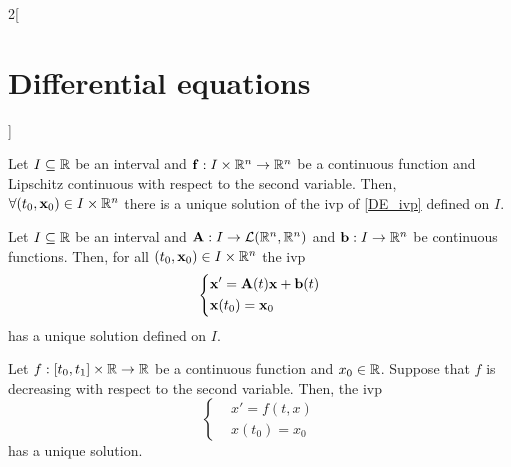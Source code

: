 \documentclass[../../../main.tex]{subfiles}
\begin{document}
\begin{multicols}{2}[\section{Differential equations}]
\begin{corollary}
    \end{corollary}
    \begin{prop}
        Let $I\subseteq\mathbb{R}$ be an interval and $\boldsymbol{\mathrm{f}}:I\times\mathbb{R}^n\rightarrow\mathbb{R}^n$ be a continuous function and Lipschitz continuous with respect to the second variable. Then, $\forall(t_0,\boldsymbol{\mathrm{x}}_0)\in I\times\mathbb{R}^n$ there is a unique solution of the ivp of \cref{DE_ivp} defined on $I$.
    \end{prop}
    \begin{corollary}
        Let $I\subseteq\mathbb{R}$ be an interval and $\boldsymbol{\mathrm{A}}:I\rightarrow\mathcal{L}(\mathbb{R}^n,\mathbb{R}^n)$ and $\boldsymbol{\mathrm{b}}:I\rightarrow\mathbb{R}^n$ be continuous functions. Then, for all $(t_0,\boldsymbol{\mathrm{x}}_0)\in I\times\mathbb{R}^n$ the ivp
        $$
            \left\{
            \begin{aligned}
                 & \boldsymbol{\mathrm{x}}'=\boldsymbol{\mathrm{A}}(t)\boldsymbol{\mathrm{x}}+\boldsymbol{\mathrm{b}}(t) \\
                 & \boldsymbol{\mathrm{x}}(t_0)=\boldsymbol{\mathrm{x}}_0
            \end{aligned}
            \right.
        $$
        has a unique solution defined on $I$.
    \end{corollary}
    \begin{theorem}
        Let $f:[t_0,t_1]\times\mathbb{R}\rightarrow\mathbb{R}$ be a continuous function and $x_0\in \mathbb{R}$. Suppose that $f$ is decreasing with respect to the second variable. Then, the ivp
        \begin{equation*}
            \left\{
            \begin{aligned}
                 & x'=f(t,x)  \\
                 & x(t_0)=x_0
            \end{aligned}
            \right.
        \end{equation*}
        has a unique solution.
    \end{theorem}

\end{multicols}
\end{document}
